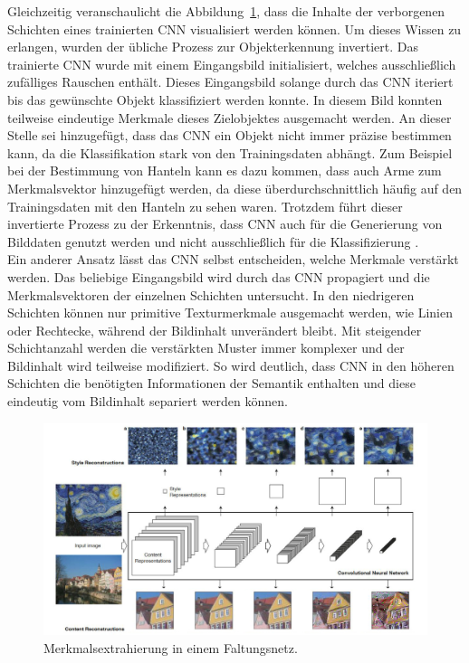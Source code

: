 \documentclass[times, 11pt,twocolumn]{article}
\begin{document}
Gleichzeitig veranschaulicht die Abbildung~\ref{fig:StyleRepresenation}, dass die Inhalte der verborgenen Schichten eines trainierten CNN visualisiert werden können. Um dieses Wissen zu erlangen, wurden der übliche Prozess zur Objekterkennung invertiert. Das trainierte CNN wurde mit einem Eingangsbild initialisiert, welches ausschließlich zufälliges Rauschen enthält. Dieses Eingangsbild solange durch das CNN iteriert bis das gewünschte Objekt klassifiziert werden konnte. In diesem Bild konnten teilweise eindeutige Merkmale dieses Zielobjektes ausgemacht werden. An dieser Stelle sei hinzugefügt, dass das CNN ein Objekt nicht immer präzise bestimmen kann, da die Klassifikation stark von den Trainingsdaten abhängt. Zum Beispiel bei der Bestimmung von Hanteln kann es dazu kommen, dass auch Arme zum Merkmalsvektor hinzugefügt werden, da diese überdurchschnittlich häufig auf den Trainingsdaten mit den Hanteln zu sehen waren. Trotzdem führt dieser invertierte Prozess zu der Erkenntnis, dass CNN auch für die Generierung von Bilddaten genutzt werden und nicht ausschließlich für die Klassifizierung \cite{DeepDream}.\\
Ein anderer Ansatz lässt das CNN selbst entscheiden, welche Merkmale verstärkt werden. Das beliebige Eingangsbild wird durch das CNN propagiert und die Merkmalsvektoren der einzelnen Schichten untersucht. In den niedrigeren Schichten können nur primitive Texturmerkmale ausgemacht werden, wie Linien oder Rechtecke, während der Bildinhalt unverändert bleibt. Mit steigender Schichtanzahl werden die verstärkten Muster immer komplexer und der Bildinhalt wird teilweise modifiziert. So wird deutlich, dass CNN in den höheren Schichten die benötigten Informationen der Semantik enthalten und diese eindeutig vom Bildinhalt separiert werden können.\\
\begin{figure}
	\flushleft
	\includegraphics[width=\columnwidth]{Bilder/StyleRepesentation.JPG}
	\caption{Merkmalsextrahierung in einem Faltungsnetz\cite{GatysEB15a}.}
	\label{fig:StyleRepresenation}
\end{figure}
\end{document}
